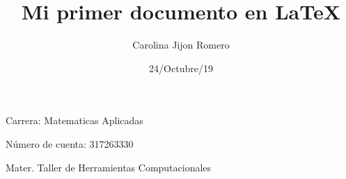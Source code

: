 \documentclass{article}%
\title{Mi primer documento en LaTeX}
\author{Carolina Jijon Romero}
\date{24/Octubre/19}
\begin{document}
	\begin{titlepage}
		\maketitle%
	\end{titlepage}

Carrera: Matematicas Aplicadas 

Número de cuenta: 317263330

Mater. Taller de Herramientas Computacionales
\vfill

\end{document}
